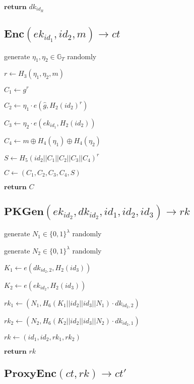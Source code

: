 \documentclass[a4paper]{article}
\begin{document}
$\textbf{return }\textit{dk}_{\textit{id}_R}$

\subsection{$\textbf{Enc}(\textit{ek}_{\textit{id}_1}, \textit{id}_2, m) \rightarrow \textit{ct}$}

generate $\eta_1, \eta_2 \in \mathbb{G}_T$ randomly

$r \gets H_3(\eta_1, \eta_2, m)$

$C_1 \gets g^r$

$C_2 \gets \eta_1 \cdot e(\hat{g}, H_2(\textit{id}_2)^r)$

$C_3 \gets \eta_2 \cdot e(\textit{ek}_{\textit{id}_1}, H_2(\textit{id}_2))$

$C_4 \gets m \oplus H_4(\eta_1) \oplus H_4(\eta_2)$

$S \gets H_5(\textit{id}_2 || C_1 || C_2 || C_3 || C_4)^r$

$C \gets (C_1, C_2, C_3, C_4, S)$

$\textbf{return }C$

\subsection{$\textbf{PKGen}(\textit{ek}_{\textit{id}_2}, \textit{dk}_{\textit{id}_2}, \textit{id}_1, \textit{id}_2, \textit{id}_3) \rightarrow \textit{rk}$}

generate $N_1 \in \{0, 1\}^\lambda$ randomly

generate $N_2 \in \{0, 1\}^\lambda$ randomly

$K_1 \gets e(\textit{dk}_{\textit{id}_2, 2}, H_2(\textit{id}_3))$

$K_2 \gets e(\textit{ek}_{\textit{id}_2}, H_2(\textit{id}_3))$

$\textit{rk}_1 \gets (N_1, H_6(K_1 || \textit{id}_2 || \textit{id}_3 || N_1) \cdot \textit{dk}_{\textit{id}_2, 2})$

$\textit{rk}_2 \gets (N_2, H_6(K_2 || \textit{id}_2 || \textit{id}_3 || N_2) \cdot \textit{dk}_{\textit{id}_2, 1})$

$\textit{rk} \gets (\textit{id}_1, \textit{id}_2, \textit{rk}_1, \textit{rk}_2)$

$\textbf{return }\textit{rk}$

\subsection{$\textbf{ProxyEnc}(\textit{ct}, \textit{rk}) \rightarrow \textit{ct}'$}
\end{document}
